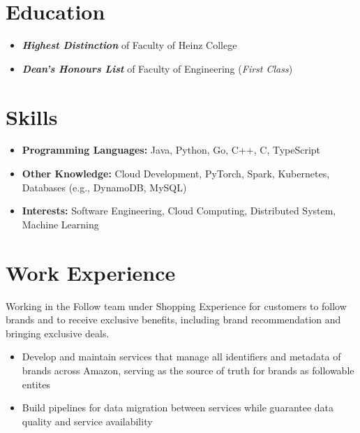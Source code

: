 \documentclass{resume}
\begin{document}



\section{Education}
\begin{itemize}[parsep=0.5ex]
  \item \textbf{\textit{Highest Distinction}} of Faculty of Heinz College
\end{itemize}
\begin{itemize}[parsep=0.5ex]
  \item \textbf{\textit{Dean's Honours List}} of Faculty of Engineering (\textit{First Class})
\end{itemize}

\section{Skills}
\begin{itemize}[parsep=0.5ex]
  \item \textbf{Programming Languages:} Java, Python, Go, C++, C, TypeScript
  \item \textbf{Other Knowledge:} Cloud Development, PyTorch, Spark, Kubernetes, Databases (e.g., DynamoDB, MySQL)
  \item \textbf{Interests:} Software Engineering, Cloud Computing, Distributed System, Machine Learning
\end{itemize}

\section{Work Experience}
\begin{flushleft}
Working in the Follow team under Shopping Experience for customers to follow brands and to receive exclusive benefits, including brand recommendation and bringing exclusive deals.
\begin{itemize}
  \item Develop and maintain services that manage all identifiers and metadata of brands across Amazon, serving as the source of truth for brands as followable entites
  \item Build pipelines for data migration between services while guarantee data quality and service availability
\end{itemize}
\end{flushleft}
\end{document}
